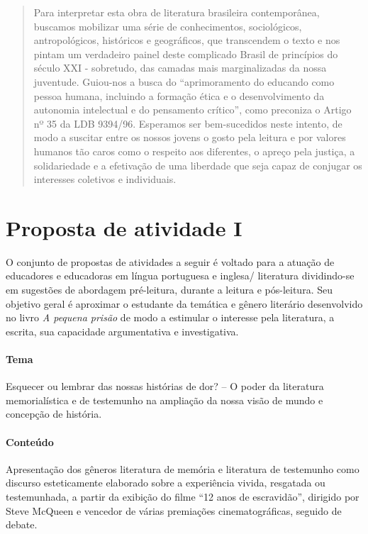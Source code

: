 \documentclass[11pt]{extarticle}
\begin{document}
\begin{abstract}
Para interpretar esta obra de literatura brasileira contemporânea,
buscamos mobilizar uma série de conhecimentos, sociológicos,
antropológicos, históricos e geográficos, que transcendem o texto e nos
pintam um verdadeiro painel deste complicado Brasil de princípios do
século XXI - sobretudo, das camadas mais marginalizadas da nossa
juventude. Guiou-nos a busca do ``aprimoramento do educando como pessoa
humana, incluindo a formação ética e o desenvolvimento da autonomia
intelectual e do pensamento crítico'', como preconiza o Artigo nº 35 da
LDB 9394/96. Esperamos ser bem-sucedidos neste intento, de modo a
suscitar entre os nossos jovens o gosto pela leitura e por valores
humanos tão caros como o respeito aos diferentes, o apreço pela justiça,
a solidariedade e a efetivação de uma liberdade que seja capaz de
conjugar os interesses coletivos e individuais.

\end{abstract}

\tableofcontents

\section{Proposta de atividade I}

O conjunto de propostas de atividades a seguir é voltado para a atuação
de educadores e educadoras em língua portuguesa e inglesa/ literatura
dividindo-se em sugestões de abordagem pré-leitura, durante a leitura e
pós-leitura. Seu objetivo geral é aproximar o estudante da temática e
gênero literário desenvolvido no livro \emph{A pequena prisão} de modo a
estimular o interesse pela literatura, a escrita, sua capacidade
argumentativa e investigativa.

\paragraph{Tema} Esquecer ou lembrar das nossas histórias de dor? -- O
poder da literatura memorialística e de testemunho na ampliação da nossa
visão de mundo e concepção de história.

\paragraph{Conteúdo} Apresentação dos gêneros literatura de memória e
literatura de testemunho como discurso esteticamente elaborado sobre a
experiência vivida, resgatada ou testemunhada, a partir da exibição do
filme ``12 anos de escravidão'', dirigido por Steve McQueen e vencedor
de várias premiações cinematográficas, seguido de debate.
\end{document}
